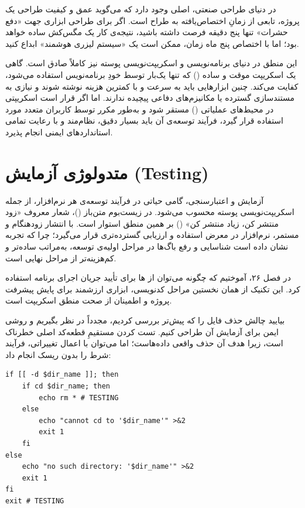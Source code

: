 در دنیای طراحی صنعتی، اصلی وجود دارد که می‌گوید عمق و کیفیت طراحی یک پروژه، تابعی از زمانِ اختصاص‌یافته به طراح است. اگر برای طراحی ابزاری جهت «دفع حشرات» تنها پنج دقیقه فرصت داشته باشید، نتیجه‌ی کار یک مگس‌کش ساده خواهد بود؛ اما با اختصاص پنج ماه زمان، ممکن است یک «سیستم لیزری هوشمند» ابداع کنید.

این منطق در دنیای برنامه‌نویسی و اسکریپت‌نویسی پوسته نیز کاملاً صادق است. گاهی یک اسکریپت موقت و ساده () که تنها یک‌بار توسط خودِ برنامه‌نویس استفاده می‌شود، کفایت می‌کند. چنین ابزارهایی باید به سرعت و با کمترین هزینه نوشته شوند و نیازی به مستندسازی گسترده یا مکانیزم‌های دفاعی پیچیده ندارند. اما اگر قرار است اسکریپتی در محیط‌های عملیاتی () مستقر شود و به‌طور مکرر توسط کاربران متعدد مورد استفاده قرار گیرد، فرآیند توسعه‌ی آن باید بسیار دقیق، نظام‌مند و با رعایت تمامی استانداردهای ایمنی انجام پذیرد.

\section{متدولوژی آزمایش (Testing)}

آزمایش و اعتبارسنجی، گامی حیاتی در فرآیند توسعه‌ی هر نرم‌افزار، از جمله اسکریپت‌نویسی پوسته محسوب می‌شود. در زیست‌بوم متن‌باز ()، شعار معروف «زود منتشر کن، زیاد منتشر کن» () بر همین منطق استوار است. با انتشار زودهنگام و مستمر، نرم‌افزار در معرض استفاده و ارزیابی گسترده‌تری قرار می‌گیرد؛ چرا که تجربه نشان داده است شناسایی و رفع باگ‌ها در مراحل اولیه‌ی توسعه، به‌مراتب ساده‌تر و کم‌هزینه‌تر از مراحل نهایی است.

در فصل ۲۶، آموختیم که چگونه می‌توان از ها برای تأیید جریان اجرای برنامه استفاده کرد. این تکنیک از همان نخستین مراحل کدنویسی، ابزاری ارزشمند برای پایش پیشرفت پروژه و اطمینان از صحت منطق اسکریپت است.

بیایید چالش حذف فایل را که پیش‌تر بررسی کردیم، مجدداً در نظر بگیریم و روشی ایمن برای آزمایش آن طراحی کنیم. تست کردن مستقیمِ قطعه‌کد اصلی خطرناک است، زیرا هدف آن حذف واقعی داده‌هاست؛ اما می‌توان با اعمال تغییراتی، فرآیند شرط را بدون ریسک انجام داد:

\begin{latin}
\begin{lstlisting}
if [[ -d $dir_name ]]; then
    if cd $dir_name; then
        echo rm * # TESTING
    else
        echo "cannot cd to '$dir_name'" >&2
        exit 1
    fi
else
    echo "no such directory: '$dir_name'" >&2
    exit 1
fi
exit # TESTING
\end{lstlisting}
\end{latin}

